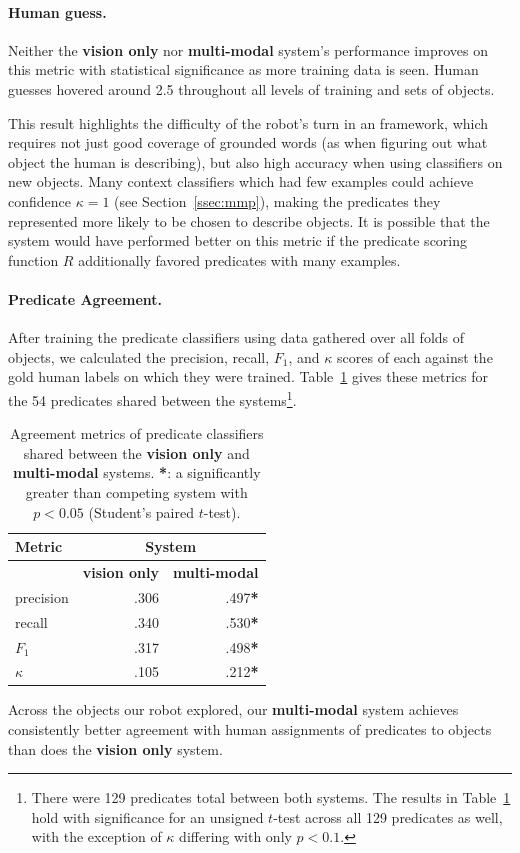 \paragraph{Human guess.}
Neither the \textbf{vision only} nor \textbf{multi-modal} system's performance improves on this metric with statistical significance as more training data is seen.
Human guesses hovered around 2.5 throughout all levels of training and sets of objects.

This result highlights the difficulty of the robot's turn in an \ispy framework, which requires not just good coverage of grounded words (as when figuring out what object the human is describing), but also high accuracy when using classifiers on new objects.
Many context classifiers which had few examples could achieve confidence $\kappa=1$ (see Section~\ref{ssec:mmp}), making the predicates they represented more likely to be chosen to describe objects.
It is possible that the system would have performed better on this metric if the predicate scoring function $R$ additionally favored predicates with many examples.

\paragraph{Predicate Agreement.}
After training the predicate classifiers using data gathered over all folds of objects, we calculated the precision, recall, $F_1$, and $\kappa$ scores of each against the gold human labels on which they were trained.
Table~\ref{tab:predicate_results} gives these metrics for the 54 predicates shared between the systems\footnote{There were 129 predicates total between both systems.
The results in Table~\ref{tab:predicate_results} hold with significance for an unsigned $t$-test across all 129 predicates as well, with the exception of $\kappa$ differing with only $p<0.1$.}.

\begin{table}
\centering
\begin{tabular}[h]{|l|r|r|}
	\hline
	\bf Metric & \multicolumn{2}{c|}{\bf System} \\ \hline \hline
	& \bf vision only & \bf multi-modal \\ \hline
	precision & .306 & .497\textbf{*} \\
	recall & .340 & .530\textbf{*} \\
	\bf $F_1$ & .317 & .498\textbf{*} \\
	\bf $\kappa$ & .105 & .212\textbf{*} \\ \hline
\end{tabular}
\caption{Agreement metrics of predicate classifiers shared between the \textbf{vision only} and \textbf{multi-modal} systems.
\textbf{*}: a significantly greater than competing system with $p<0.05$ (Student's paired $t$-test).}
\label{tab:predicate_results}
\end{table}

Across the objects our robot explored, our \textbf{multi-modal} system achieves consistently better agreement with human assignments of predicates to objects than does the \textbf{vision only} system.

